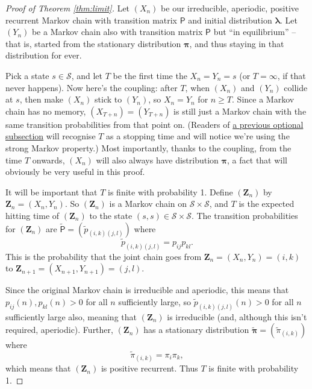 \documentclass[
  a4paper,
]{article}
\theoremstyle{definition}
\theoremstyle{definition}
\theoremstyle{definition}
\theoremstyle{remark}
\begin{document}
\begin{proof}[Proof of Theorem \ref{thm:limit}]

Let \((X_n)\) be our irreducible, aperiodic, positive recurrent Markov chain with transition matrix \(\mathsf P\) and initial distribution \(\boldsymbol\lambda\). Let \((Y_n)\) be a Markov chain also with transition matrix \(\mathsf P\) but ``in equilibrium'' -- that is, started from the stationary distribution \(\boldsymbol\pi\), and thus staying in that distribution for ever.

Pick a state \(s \in \mathcal S\), and let \(T\) be the first time the \(X_n = Y_n = s\) (or \(T = \infty\), if that never happens). Now here's the coupling: after \(T\), when \((X_n)\) and \((Y_n)\) collide at \(s\), then make \((X_n)\) stick to \((Y_n)\), so \(X_n = Y_n\) for \(n \geq T\). Since a Markov chain has no memory, \((X_{T+n}) = (Y_{T+n})\) is still just a Markov chain with the same transition probabilities from that point on. (Readers of \protect\hyperlink{S09-strong-markov}{a previous optional subsection} will recognise \(T\) as a stopping time and will notice we're using the strong Markov property.) Most importantly, thanks to the coupling, from the time \(T\) onwards, \((X_n)\) will also always have distribution \(\boldsymbol\pi\), a fact that will obviously be very useful in this proof.

It will be important that \(T\) is finite with probability 1. Define \((\mathbf Z_n)\) by \(\mathbf Z_n = (X_n, Y_n)\). So \((\mathbf Z_n)\) is a Markov chain on \(\mathcal S \times \mathcal S\), and \(T\) is the expected hitting time of \((\mathbf Z_n)\) to the state \((s, s) \in \mathcal S \times \mathcal S\). The transition probabilities for \((\mathbf Z_n)\) are \(\mathsf{\tilde P} = (\tilde p_{(i,k)(j,l)})\) where
\[ \tilde p_{(i,k)(j,l)} = p_{ij}p_{kl} . \]
This is the probability that the joint chain goes from \(\mathbf Z_n = (X_n, Y_n) = (i, k)\) to \(\mathbf Z_{n+1} = (X_{n+1}, Y_{n+1}) = (j, l)\).

Since the original Markov chain is irreducible and aperiodic, this means that \(p_{ij}(n), p_{kl}(n) > 0\) for all \(n\) sufficiently large, so \(\tilde p_{(i,k)(j,l)}(n) > 0\) for all \(n\) sufficiently large also, meaning that \((\mathbf Z_n)\) is irreducible (and, although this isn't required, aperiodic). Further, \((\mathbf Z_n)\) has a stationary distribution \(\mathbf{\tilde \pi} = (\tilde \pi_{(i,k)})\) where
\[ \tilde \pi_{(i,k)} = \pi_i \pi_k , \]
which means that \((\mathbf Z_n)\) is positive recurrent. Thus \(T\) is finite with probability 1.


\end{proof}
\end{document}
